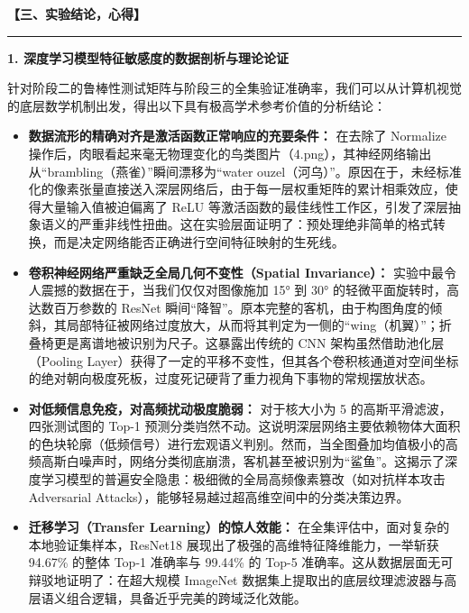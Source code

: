 \documentclass[a4paper,12pt]{article}
\newenvironment{sectionbox}[1]
{%
    \begin{center}
    \fboxrule=1pt
    \fboxsep=8pt
    \begin{minipage}{0.98\textwidth}
    \textbf{#1}
    \par\vspace{4pt}
    \hrule
    \vspace{6pt}
}
{%
    \end{minipage}
    \end{center}
}
\begin{document}
\begin{sectionbox}{【三、实验结论，心得】}


\vspace{4pt}
\textbf{1. 深度学习模型特征敏感度的数据剖析与理论论证}

针对阶段二的鲁棒性测试矩阵与阶段三的全集验证准确率，我们可以从计算机视觉的底层数学机制出发，得出以下具有极高学术参考价值的分析结论：

\begin{itemize}
    \item \textbf{数据流形的精确对齐是激活函数正常响应的充要条件：} 在去除了 Normalize 操作后，肉眼看起来毫无物理变化的鸟类图片（4.png），其神经网络输出从“brambling（燕雀）”瞬间漂移为“water ouzel（河乌）”。原因在于，未经标准化的像素张量直接送入深层网络后，由于每一层权重矩阵的累计相乘效应，使得大量输入值被迫偏离了 ReLU 等激活函数的最佳线性工作区，引发了深层抽象语义的严重非线性扭曲。这在实验层面证明了：预处理绝非简单的格式转换，而是决定网络能否正确进行空间特征映射的生死线。

    \item \textbf{卷积神经网络严重缺乏全局几何不变性（Spatial Invariance）：} 实验中最令人震撼的数据在于，当我们仅仅对图像施加 15° 到 30° 的轻微平面旋转时，高达数百万参数的 ResNet 瞬间“降智”。原本完整的客机，由于构图角度的倾斜，其局部特征被网络过度放大，从而将其判定为一侧的“wing（机翼）”；折叠椅更是离谱地被识别为尺子。这暴露出传统的 CNN 架构虽然借助池化层（Pooling Layer）获得了一定的平移不变性，但其各个卷积核通道对空间坐标的绝对朝向极度死板，过度死记硬背了重力视角下事物的常规摆放状态。

    \item \textbf{对低频信息免疫，对高频扰动极度脆弱：} 对于核大小为 5 的高斯平滑滤波，四张测试图的 Top-1 预测分类岿然不动。这说明深层网络主要依赖物体大面积的色块轮廓（低频信号）进行宏观语义判别。然而，当全图叠加均值极小的高频高斯白噪声时，网络分类彻底崩溃，客机甚至被识别为“鲨鱼”。这揭示了深度学习模型的普遍安全隐患：极细微的全局高频像素篡改（如对抗样本攻击 Adversarial Attacks），能够轻易越过超高维空间中的分类决策边界。

    \item \textbf{迁移学习（Transfer Learning）的惊人效能：} 在全集评估中，面对复杂的本地验证集样本，ResNet18 展现出了极强的高维特征降维能力，一举斩获 94.67\% 的整体 Top-1 准确率与 99.44\% 的 Top-5 准确率。这从数据层面无可辩驳地证明了：在超大规模 ImageNet 数据集上提取出的底层纹理滤波器与高层语义组合逻辑，具备近乎完美的跨域泛化效能。
\end{itemize}


\end{sectionbox}
\end{document}
